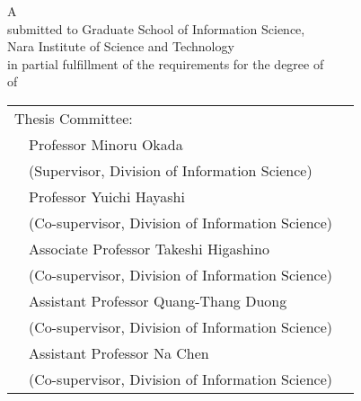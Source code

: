 \renewcommand\thepage{Title2}
\thispagestyle{empty}
\vspace*{8.9truecm}
\begin{center}
 A \edoctitle \\
 submitted to Graduate School of Information Science, \\
 Nara Institute of Science and Technology \\
 in partial fulfillment of the requirements for the degree of \\
 {\degree} of \major \\
 \bigskip

 \eauthor

 \vspace*{3.5truemm}

 \centering
 \begin{tabular}[t]{p{}ll}
  \multicolumn{2}{l}{Thesis Committee:} \\
  & Professor Minoru Okada \\& (Supervisor, Division of Information Science) \\
  & Professor Yuichi Hayashi \\& (Co-supervisor, Division of Information Science) \\
  & Associate Professor Takeshi Higashino \\& (Co-supervisor, Division of Information Science) \\
  & Assistant Professor Quang-Thang Duong \\& (Co-supervisor, Division of Information Science) \\
  & Assistant Professor Na Chen \\& (Co-supervisor, Division of Information Science)
 \end{tabular}
\end{center}